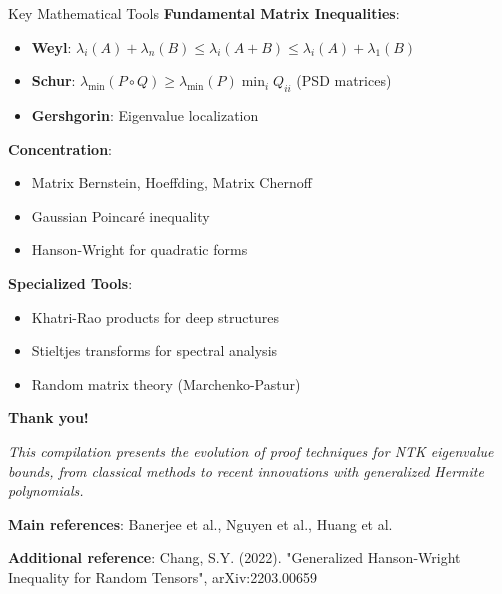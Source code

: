 \documentclass{beamer}
\newcommand{\evmin}[1]{\lambda_{\min}\left(#1\right)}
\begin{document}
\begin{frame}{Key Mathematical Tools}
  \textbf{Fundamental Matrix Inequalities}:
  \begin{itemize}
    \item \textbf{Weyl}: $\lambda_i(A) + \lambda_n(B) \leq \lambda_i(A + B) \leq \lambda_i(A) + \lambda_1(B)$
    \item \textbf{Schur}: $\evmin{P \circ Q} \geq \evmin{P} \min_i Q_{ii}$ (PSD matrices)
    \item \textbf{Gershgorin}: Eigenvalue localization
  \end{itemize}
  
  \textbf{Concentration}:
  \begin{itemize}
    \item Matrix Bernstein, Hoeffding, Matrix Chernoff
    \item Gaussian Poincaré inequality
    \item Hanson-Wright for quadratic forms
  \end{itemize}
  
  \textbf{Specialized Tools}:
  \begin{itemize}
    \item Khatri-Rao products for deep structures
    \item Stieltjes transforms for spectral analysis
    \item Random matrix theory (Marchenko-Pastur)
  \end{itemize}
\end{frame}

\begin{frame}
  \begin{center}
    \textbf{Thank you!}
    
    \vspace{1em}
    
    \textit{This compilation presents the evolution of proof techniques for NTK eigenvalue bounds, from classical methods to recent innovations with generalized Hermite polynomials.}
    
    \vspace{1em}
    
    \textbf{Main references}: Banerjee et al., Nguyen et al., Huang et al.
    
    \vspace{0.5em}
    
    \textbf{Additional reference}: Chang, S.Y. (2022). "Generalized Hanson-Wright Inequality for Random Tensors", arXiv:2203.00659
  \end{center}
\end{frame}
\end{document}
